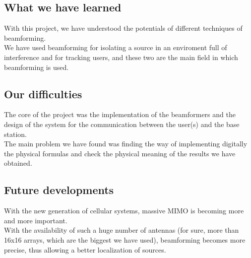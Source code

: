 \subsection{What we have learned}

With this project, we have understood the potentials of different techniques of beamforming.\\
We have used beamforming for isolating a source in an enviroment full of interference and for tracking users,
and these two are the main field in which beamforming is used. 

\subsection{Our difficulties}

The core of the project was the implementation of the beamformers and the design of the system for the communication 
between the user(s) and the base station.\\
The main problem we have found was finding the way of implementing digitally the physical formulas and check the physical meaning 
of the results we have obtained.

\subsection{Future developments}

With the new generation of cellular systems, massive MIMO is becoming more and more important.\\ 
With the availability of such a huge number of antennas (for sure, more than 16x16 arrays, which are the biggest we 
have used), beamforming becomes more precise, thus allowing a better localization of sources. 